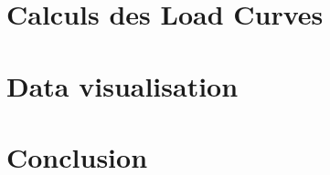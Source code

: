 \documentclass{report}
\begin{document}
\chapter{Calculs des Load Curves}





\chapter{Data visualisation}



\chapter{Conclusion}



\appendix


\end{document}
